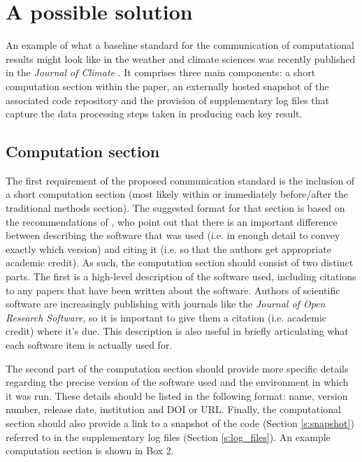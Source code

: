 \section{A possible solution}

An example of what a baseline standard for the communication of computational results might look like in the weather and climate sciences was recently published in the \textit{Journal of Climate} \citep{Irving2015}. It comprises three main components: a short computation section within the paper, an externally hosted snapshot of the associated code repository and the provision of supplementary log files that capture the data processing steps taken in producing each key result. 

\subsection{Computation section}

The first requirement of the proposed communication standard is the inclusion of a short computation section (most likely within or immediately before/after the traditional methods section). The suggested format for that section is based on the recommendations of \citet{Jackson2012}, who point out that there is an important difference between describing the software that was used (i.e. in enough detail to convey exactly which version) and citing it (i.e. so that the authors get appropriate academic credit). As such, the computation section should consist of two distinct parts. The first is a high-level description of the software used, including citations to any papers that have been written about the software. Authors of scientific software are increasingly publishing with journals like the \textit{Journal of Open Research Software}, so it is important to give them a citation (i.e. academic credit) where it's due. This description is also useful in briefly articulating what each software item is actually used for.

The second part of the computation section should provide more specific details regarding the precise version of the software used and the environment in which it was run. These details should be listed in the following format: name, version number, release date, institution and DOI or URL. Finally, the computational section should also provide a link to a snapshot of the code (Section \ref{s:snapshot}) referred to in the supplementary log files (Section \ref{s:log_files}). An example computation section is shown in Box 2.  

